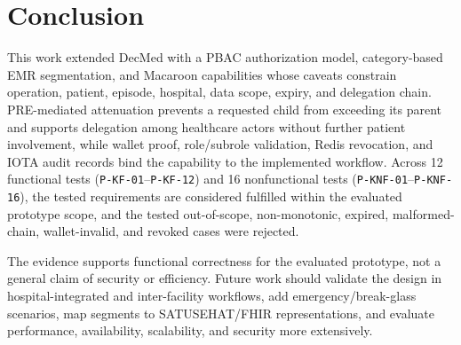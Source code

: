 \section{Conclusion}
\label{sec:conclusion}

This work extended DecMed with a PBAC authorization model, category-based EMR segmentation, and Macaroon capabilities whose caveats constrain operation, patient, episode, hospital, data scope, expiry, and delegation chain. PRE-mediated attenuation prevents a requested child from exceeding its parent and supports delegation among healthcare actors without further patient involvement, while wallet proof, role/subrole validation, Redis revocation, and IOTA audit records bind the capability to the implemented workflow. Across 12 functional tests (\texttt{P-KF-01}--\texttt{P-KF-12}) and 16 nonfunctional tests (\texttt{P-KNF-01}--\texttt{P-KNF-16}), the tested requirements are considered fulfilled within the evaluated prototype scope, and the tested out-of-scope, non-monotonic, expired, malformed-chain, wallet-invalid, and revoked cases were rejected.

The evidence supports functional correctness for the evaluated prototype, not a general claim of security or efficiency. Future work should validate the design in hospital-integrated and inter-facility workflows, add emergency/break-glass scenarios, map segments to SATUSEHAT/FHIR representations, and evaluate performance, availability, scalability, and security more extensively.
